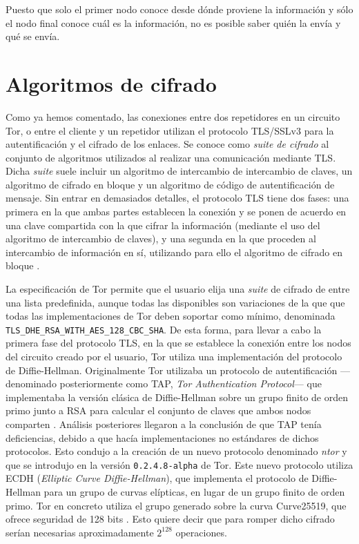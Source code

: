 \documentclass[
  a4paper,
  12pt,
  spanish,
]{scrartcl}
\begin{document}
Puesto que solo el primer nodo conoce desde dónde proviene la información y sólo el nodo final conoce cuál es la información, no es posible saber quién la envía y qué se envía.

\section{Algoritmos de cifrado}
\label{sec:algoritmos}

Como ya hemos comentado, las conexiones entre dos repetidores en un circuito Tor, o entre el cliente y un repetidor utilizan el protocolo TLS/SSLv3 para la autentificación y el cifrado de los enlaces.
Se conoce como \textit{suite de cifrado} al conjunto de algoritmos utilizados al realizar una comunicación mediante TLS.
Dicha \textit{suite} suele incluir un algoritmo de intercambio de intercambio de claves, un algoritmo de cifrado en bloque y un algoritmo de código de autentificación de mensaje.
Sin entrar en demasiados detalles, el protocolo TLS tiene dos fases: una primera en la que ambas partes establecen la conexión y se ponen de acuerdo en una clave compartida con la que cifrar la información (mediante el uso del algoritmo de intercambio de claves), y una segunda en la que proceden al intercambio de información en sí, utilizando para ello el algoritmo de cifrado en bloque \parencite{ibm_overview_2019}.

La especificación de Tor \parencite{dingledine_tor_2019} permite que el usuario elija una \textit{suite} de cifrado de entre una lista predefinida, aunque todas las disponibles son variaciones de la que que todas las implementaciones  de Tor deben soportar como mínimo, denominada \texttt{TLS\_DHE\_RSA\_WITH\_AES\_128\_CBC\_SHA}.
De esta forma, para llevar a cabo la primera fase del protocolo TLS, en la que se establece la conexión entre los nodos del circuito creado por el usuario, Tor utiliza una implementación del protocolo de Diffie-Hellman.
Originalmente Tor utilizaba un protocolo de autentificación ---denominado posteriormente como TAP, \textit{Tor Authentication Protocol}--- que implementaba la versión clásica de Diffie-Hellman sobre un grupo finito de orden primo junto a RSA para calcular el conjunto de claves que ambos nodos comparten \parencite{dingledine_tor:_2004}.
Análisis posteriores \parencite{hutchison_security_2006} llegaron a la conclusión de que TAP tenía deficiencias, debido a que hacía implementaciones no estándares de dichos protocolos. Esto condujo a la creación de un nuevo protocolo denominado \textit{ntor} y que se introdujo en la versión \texttt{0.2.4.8-alpha} de Tor.
Este nuevo protocolo utiliza ECDH (\textit{Elliptic Curve Diffie-Hellman}), que implementa el protocolo de Diffie-Hellman para un grupo de curvas elípticas, en lugar de un grupo finito de orden primo. Tor en concreto utiliza el grupo generado sobre la curva Curve25519, que ofrece seguridad de 128 bits \parencite{yung_curve25519:_2006}. Esto quiere decir que para romper dicho cifrado serían necesarias aproximadamente \(2^{128}\) operaciones.
\end{document}
